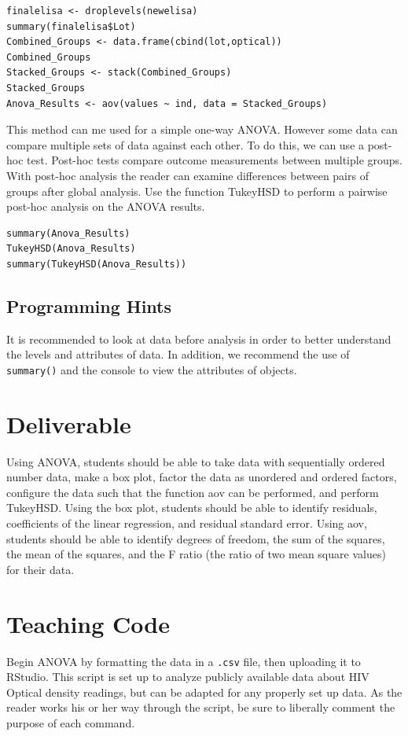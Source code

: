\begin{lstlisting}
finalelisa <- droplevels(newelisa)
summary(finalelisa$Lot)
Combined_Groups <- data.frame(cbind(lot,optical))
Combined_Groups
Stacked_Groups <- stack(Combined_Groups)
Stacked_Groups
Anova_Results <- aov(values ~ ind, data = Stacked_Groups)
\end{lstlisting}
This method can me used for a simple one-way ANOVA. However some data can compare multiple sets of data against each other. To do this, we can use a post-hoc test. Post-hoc tests compare outcome measurements between multiple groups. With post-hoc analysis the reader can examine differences between pairs of groups after global analysis. Use the function TukeyHSD to perform a pairwise post-hoc analysis on the ANOVA results.
\begin{lstlisting}
summary(Anova_Results)
TukeyHSD(Anova_Results)
summary(TukeyHSD(Anova_Results))
\end{lstlisting}
 \subsection{Programming Hints}
It is recommended to look at data before analysis in order to better understand the levels and attributes of data.
In addition, we recommend the use of \texttt{summary()} and the console to view the attributes of objects.
 
\section{Deliverable}

Using ANOVA, students should be able to take data with sequentially ordered number data, make a box plot, factor the data as unordered and ordered factors, configure the data such that the function aov can be performed, and perform TukeyHSD.
Using the box plot, students should be able to identify residuals, coefficients of the linear regression, and residual standard error. 
Using aov, students should be able to identify degrees of freedom, the sum of the squares, the mean of the squares, and the F ratio (the ratio of two mean square values) for their data. 

\section{Teaching Code}

Begin ANOVA by formatting the data in a \texttt{.csv} file, then uploading it to RStudio.
This script is set up to analyze publicly available data about HIV Optical density readings, but can be adapted for any properly set up data. 
As the reader works his or her way through the script, be sure to liberally comment the purpose of each command. 

